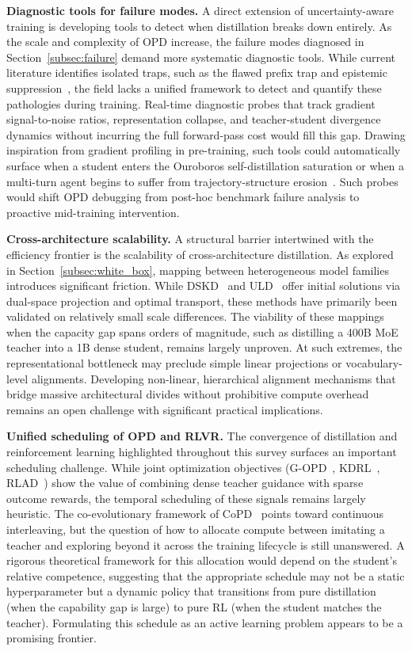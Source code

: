 \documentclass{article} %
\begin{document}
\textbf{Diagnostic tools for failure modes.} A direct extension of uncertainty-aware training is developing tools to detect when distillation breaks down entirely. As the scale and complexity of OPD increase, the failure modes diagnosed in Section~\ref{subsec:failure} demand more systematic diagnostic tools. While current literature identifies isolated traps, such as the flawed prefix trap and epistemic suppression~\citep{2603.24472}, the field lacks a unified framework to detect and quantify these pathologies during training. Real-time diagnostic probes that track gradient signal-to-noise ratios, representation collapse, and teacher-student divergence dynamics without incurring the full forward-pass cost would fill this gap. Drawing inspiration from gradient profiling in pre-training, such tools could automatically surface when a student enters the Ouroboros self-distillation saturation or when a multi-turn agent begins to suffer from trajectory-structure erosion~\citep{2605.02943}. Such probes would shift OPD debugging from post-hoc benchmark failure analysis to proactive mid-training intervention.

\textbf{Cross-architecture scalability.} A structural barrier intertwined with the efficiency frontier is the scalability of cross-architecture distillation. As explored in Section~\ref{subsec:white_box}, mapping between heterogeneous model families introduces significant friction. While DSKD~\citep{2504.11426} and ULD~\citep{2402.12030} offer initial solutions via dual-space projection and optimal transport, these methods have primarily been validated on relatively small scale differences. The viability of these mappings when the capacity gap spans orders of magnitude, such as distilling a 400B MoE teacher into a 1B dense student, remains largely unproven. At such extremes, the representational bottleneck may preclude simple linear projections or vocabulary-level alignments. Developing non-linear, hierarchical alignment mechanisms that bridge massive architectural divides without prohibitive compute overhead remains an open challenge with significant practical implications.

\textbf{Unified scheduling of OPD and RLVR.} The convergence of distillation and reinforcement learning highlighted throughout this survey surfaces an important scheduling challenge. While joint optimization objectives (G-OPD~\citep{2602.12125}, KDRL~\citep{2506.02208}, RLAD~\citep{2602.22495}) show the value of combining dense teacher guidance with sparse outcome rewards, the temporal scheduling of these signals remains largely heuristic. The co-evolutionary framework of CoPD~\citep{2604.27083} points toward continuous interleaving, but the question of how to allocate compute between imitating a teacher and exploring beyond it across the training lifecycle is still unanswered. A rigorous theoretical framework for this allocation would depend on the student's relative competence, suggesting that the appropriate schedule may not be a static hyperparameter but a dynamic policy that transitions from pure distillation (when the capability gap is large) to pure RL (when the student matches the teacher). Formulating this schedule as an active learning problem appears to be a promising frontier.
\end{document}
